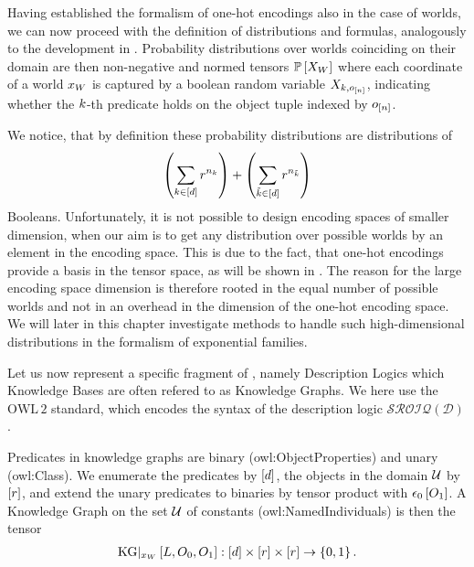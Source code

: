 
Having established the formalism of one-hot encodings also in the case of \firstOrderLogic{} worlds, we can now proceed with the definition of distributions and formulas, analogously to the development in .
Probability distributions over worlds coinciding on their domain are then non-negative and normed tensors $\mathbb{P}\left[X_{W}\right]$ where each coordinate of a world $x_{W}$ is captured by a boolean random variable $X_{k,o_{[n]}}$, indicating whether the $k$-th predicate holds on the object tuple indexed by $o_{[n]}$.

We notice, that by definition these probability distributions are distributions of
\begin{align*}
    \left(\sum_{k\in[d]}r^{n_{k}}\right) +  \left(\sum_{\tilde{k}\in[d]}r^{n_{\tilde{k}}}\right)
\end{align*}
Booleans.
Unfortunately, it is not possible to design encoding spaces of smaller dimension, when our aim is to get any distribution over possible worlds by an element in the encoding space.
This is due to the fact, that one-hot encodings provide a basis in the tensor space, as will be shown in .
The reason for the large encoding space dimension is therefore rooted in the equal number of possible worlds and not in an overhead in the dimension of the one-hot encoding space.
We will later in this chapter investigate methods to handle such high-dimensional distributions in the formalism of exponential families.





\label{sec:kgRepresentation}

Let us now represent a specific fragment of \firstOrderLogic{}, namely Description Logics which Knowledge Bases are often refered to as Knowledge Graphs.
We here use the $\mathrm{OWL\,2}$ standard, which encodes the syntax of the description logic $\mathcal{SROIQ(D)}$ \cite{rudolph_foundations_2011}.


Predicates in knowledge graphs are binary (owl:ObjectProperties) and unary (owl:Class).
We enumerate the predicates by $[d]$, the objects in the domain $\mathcal{U}$ by $[r]$, and extend the unary predicates to binaries by tensor product with $\epsilon_{0}\left[O_{1}\right]$.
A Knowledge Graph on the set $\mathcal{U}$ of constants (owl:NamedIndividuals) is then the tensor
\begin{align*}
    \mathrm{KG}|_{x_{W}}\left[L,O_{0},O_{1}\right] : [d] \times [r] \times [r] \rightarrow \{0,1\} \, .
\end{align*}


